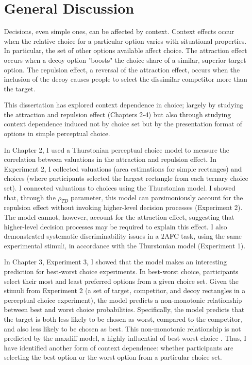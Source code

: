 \section{General Discussion}

Decisions, even simple ones, can be affected by context. Context effects occur when the relative choice for a particular option varies with situational properties. In particular, the set of other options available affect choice. The attraction effect occurs when a decoy option "boosts" the choice share of a similar, superior target option. The repulsion effect, a reversal of the attraction effect, occurs when the inclusion of the decoy causes people to select the dissimilar competitor more than the target. 

This dissertation has explored context dependence in choice; largely by studying the attraction and repulsion effect (Chapters 2-4) but also through studying context dependence induced not by choice set but by the presentation format of options in simple perceptual choice.

In Chapter 2, I used a Thurstonian perceptual choice model \parencite{thurstone1927law} to measure the correlation between valuations in the attraction and repulsion effect. In Experiment 2, I collected valuations (area estimations for simple rectanges) and choices (where participants selected the largest rectangle from each ternary choice set). I connected valuations to choices using the Thurstonian model. I showed that, through the $\rho_{TD}$ parameter, this model can parsimoniously account for the repulsion effect without invoking higher-level decision processes (Experiment 2). The model cannot, however, account for the attraction effect, suggesting that higher-level decision processes may be required to explain this effect. I also demonstrated systematic discriminability issues in a 2AFC task, using the same experimental stimuli, in accordance with the Thurstonian model (Experiment 1).

In Chapter 3, Experiment 3, I showed that the model makes an interesting prediction for best-worst choice experiments. In best-worst choice, participants select their most and least preferred options from a given choice set. Given the stimuli from Experiment 2 (a set of target, competitor, and decoy rectangles in a perceptual choice experiment), the model predicts a non-monotonic relationship between best and worst choice probabilities. Specifically, the model predicts that the target is both less likely to be chosen as worst, compared to the competitor, and also less likely to be chosen as best. This non-monotonic relationship is not predicted by the maxdiff model, a highly influential of best-worst choice \parencite{marleyProbabilisticModelsBest2005}. Thus, I have identified another form of context dependence: whether participants are selecting the best option or the worst option from a particular choice set.

